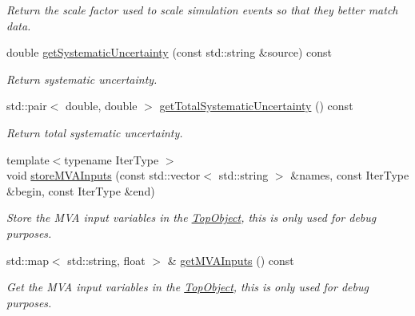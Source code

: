 \begin{DoxyCompactItemize}
\begin{DoxyCompactList}\small\item\em Return the scale factor used to scale simulation events so that they better match data. \end{DoxyCompactList}\item 
\hypertarget{classTopObject_add523f130ec310825913f90f2ad92cd1}{double \hyperlink{classTopObject_add523f130ec310825913f90f2ad92cd1}{get\-Systematic\-Uncertainty} (const std\-::string \&source) const }\label{classTopObject_add523f130ec310825913f90f2ad92cd1}

\begin{DoxyCompactList}\small\item\em Return systematic uncertainty. \end{DoxyCompactList}\item 
\hypertarget{classTopObject_a1c0c5edafaa226f473002826f291c3ef}{std\-::pair$<$ double, double $>$ \hyperlink{classTopObject_a1c0c5edafaa226f473002826f291c3ef}{get\-Total\-Systematic\-Uncertainty} () const }\label{classTopObject_a1c0c5edafaa226f473002826f291c3ef}

\begin{DoxyCompactList}\small\item\em Return total systematic uncertainty. \end{DoxyCompactList}\item 
\hypertarget{classTopObject_aba6a5e510488a050a1ade69ba2d87960}{{\footnotesize template$<$typename Iter\-Type $>$ }\\void \hyperlink{classTopObject_aba6a5e510488a050a1ade69ba2d87960}{store\-M\-V\-A\-Inputs} (const std\-::vector$<$ std\-::string $>$ \&names, const Iter\-Type \&begin, const Iter\-Type \&end)}\label{classTopObject_aba6a5e510488a050a1ade69ba2d87960}

\begin{DoxyCompactList}\small\item\em Store the M\-V\-A input variables in the \hyperlink{classTopObject}{Top\-Object}, this is only used for debug purposes. \end{DoxyCompactList}\item 
\hypertarget{classTopObject_a7bedcf64865a2890c32e6699964d66f0}{std\-::map$<$ std\-::string, float $>$ \& \hyperlink{classTopObject_a7bedcf64865a2890c32e6699964d66f0}{get\-M\-V\-A\-Inputs} () const }\label{classTopObject_a7bedcf64865a2890c32e6699964d66f0}

\begin{DoxyCompactList}\small\item\em Get the M\-V\-A input variables in the \hyperlink{classTopObject}{Top\-Object}, this is only used for debug purposes. \end{DoxyCompactList}\end{DoxyCompactItemize}


